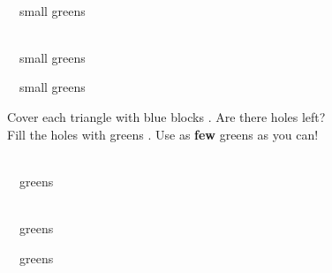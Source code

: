 \vspace{0.25in}
\noindent
\begin{minipage}[b]{3.0in}\centering
{}\\[0.15in]
~\ansbox~small greens
\end{minipage}\hfill
\begin{minipage}[b]{4.0in}\centering
{}\\[0.15in]
~\ansbox~small greens
\end{minipage}

\vspace{0.4in}
\noindent
\begin{minipage}[b]{4.1in}
\end{minipage}\hfill
\begin{minipage}[b]{3.25in}\centering
{}~\ansbox[0.75in]~small greens\\[0.35in]
\end{minipage}
\actualsize
\newpage

Cover each triangle with blue blocks . Are there holes left?\\[2pt]
Fill the holes with greens . Use as \textbf{few} greens as you can!

\vspace{0.25in}
\noindent
\begin{minipage}[b]{3.0in}\centering
{}\\[0.15in]
~\ansbox~greens
\end{minipage}\hfill
\begin{minipage}[b]{4.0in}\centering
{}\\[0.15in]
~\ansbox~greens
\end{minipage}

\vspace{0.4in}
\noindent
\begin{minipage}[b]{4.1in}
\end{minipage}\hfill
\begin{minipage}[b]{3.25in}\centering
{}~\ansbox~greens\\[0.35in]
\end{minipage}
\actualsize

